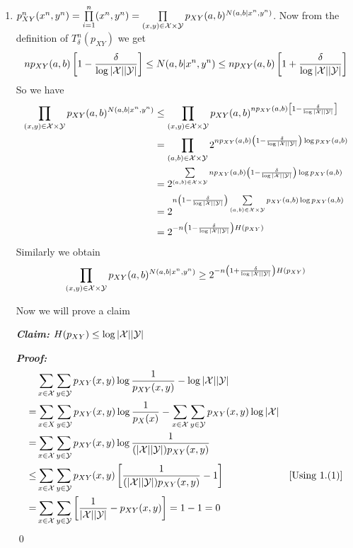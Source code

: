 \documentclass[a4paper, 11pt]{article}
\begin{document}
{\begin{enumerate}
		
		\item $p^n_{XY}(x^n,y^n)=\prod\limits_{i=1}^n(x^n,y^n)=\prod\limits_{(x,y)\in \mathcal{X}\times \mathcal{Y}}p_{XY}(a,b)^{N(a,b|x^n,y^n)}$. Now from the definition of $T_{\delta}^n(p_{XY})$ we get $$np_{XY}(a,b)\left[ 1-\frac{\delta }{\log |\mathcal{X}||\mathcal{Y}|} \right]\leq N(a,b|x^n,y^n)\leq np_{XY}(a,b)\left[ 1+\frac{\delta }{\log |\mathcal{X}||\mathcal{Y}|} \right]$$
		So we have \begin{align*}
			\prod\limits_{(x,y)\in \mathcal{X}\times \mathcal{Y}}p_{XY}(a,b)^{N(a,b|x^n,y^n)} & \leq  \prod\limits_{(x,y)\in \mathcal{X}\times \mathcal{Y}}p_{XY}(a,b)^{np_{XY}(a,b)\left[ 1-\frac{\delta}{\log |\mathcal{X}||\mathcal{Y}|} \right]}      \\
			                                                                    & =\prod_{(a,b)\in\mathcal{X}\times \mathcal{Y}}2^{ np_{XY}(a,b)\left( 1-\frac{\delta}{\log |\mathcal{X}||\mathcal{Y}|} \right) \log p_{XY}(a,b)  } \\
			                                                                    & =2^{\sum\limits_{(a,b)\in\mathcal{X}\times \mathcal{Y}} np_{XY}(a,b)\left( 1-\frac{\delta}{\log |\mathcal{X}||\mathcal{Y}|} \right) \log p_{XY}(a,b)  }\\
			                                                                    & =2^{n\left( 1-\frac{\delta}{\log |\mathcal{X}||\mathcal{Y}|} \right)\sum\limits_{(a,b)\in\mathcal{X}\times \mathcal{Y}} p_{XY}(a,b) \log p_{XY}(a,b)  }  \\
			                                                                    & =2^{-n\left( 1-\frac{\delta}{\log |\mathcal{X}||\mathcal{Y}|} \right) H(p_{XY})}
		\end{align*}
		Similarly we obtain $$	\prod\limits_{(x,y)\in \mathcal{X}\times \mathcal{Y}}p_{XY}(a,b)^{N(a,b|x^n,y^n)}\geq 2^{-n\left( 1+\frac{\delta}{\log |\mathcal{X}||\mathcal{Y}|} \right) H(p_{XY})}$$
		
		Now we will prove a claim
		
		\textbf{\textit{Claim:}} $H(p_{XY})\leq \log |\mathcal{X}||\mathcal{Y}|$
		
		\textbf{\textit{Proof:}} \begin{align*}
			     & \sum_{x\in \mathcal{X}}\sum_{y\in \mathcal{Y}}p_{XY}(x,y)\log \frac1{p_{XY}(x,y)}-\log |\mathcal{X}||\mathcal{Y}|                             &                      \\
			=    & \sum_{x\in X}\sum_{y\in \mathcal{Y}}p_{XY}(x,y)\log \frac1{p_X(x)}-\sum_{x\in \mathcal{X}}\sum_{y\in \mathcal{Y}}p_{XY}(x,y)\log|\mathcal{X}| &                      \\
			=    & \sum_{x\in \mathcal{X}}\sum_{y\in \mathcal{Y}}p_{XY}(x,y)\log \frac{1}{(|\mathcal{X}||\mathcal{Y}|)p_{XY}(x,y)}                               &                      \\
			\leq & \sum_{x\in \mathcal{X}}\sum_{y\in \mathcal{Y}} p_{XY}(x,y)\left[ \frac1{(|\mathcal{X}||\mathcal{Y}|)p_{XY}(x,y)}-1 \right]                         & [\text{Using 1.(1)}] \\
			=    & \sum_{x\in \mathcal{X}}\sum_{y\in \mathcal{Y}}\left[  \frac{1}{|\mathcal{X}||\mathcal{Y}|}-p_{XY}(x,y)\right] =1-1=0                               &
		\end{align*}\qed
		

\end{enumerate}}
\end{document}
